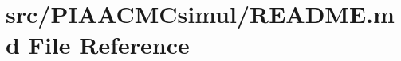 \hypertarget{src_2PIAACMCsimul_2README_8md}{\section{src/\+P\+I\+A\+A\+C\+M\+Csimul/\+R\+E\+A\+D\+M\+E.md File Reference}
\label{src_2PIAACMCsimul_2README_8md}
}
